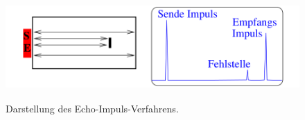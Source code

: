 \begin{figure}[H]
  \centering
  \includegraphics[height=4cm]{ressources/echo.png}
  \caption{Darstellung des Echo-Impuls-Verfahrens. \cite{skript}}
  \label{abb:2}
\end{figure}



